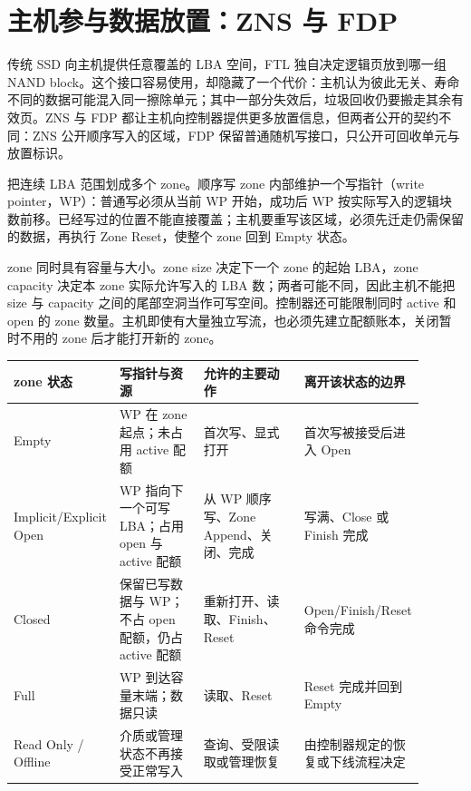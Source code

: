 \section{主机参与数据放置：ZNS 与 FDP}

传统 SSD 向主机提供任意覆盖的 LBA 空间，FTL 独自决定逻辑页放到哪一组 NAND block。这个接口容易使用，却隐藏了一个代价：主机认为彼此无关、寿命不同的数据可能混入同一擦除单元；其中一部分失效后，垃圾回收仍要搬走其余有效页。ZNS 与 FDP 都让主机向控制器提供更多放置信息，但两者公开的契约不同：ZNS 公开顺序写入的区域，FDP 保留普通随机写接口，只公开可回收单元与放置标识。\cite{nvme-zns-fdp}


把连续 LBA 范围划成多个 zone。顺序写 zone 内部维护一个写指针（write pointer，WP）：普通写必须从当前 WP 开始，成功后 WP 按实际写入的逻辑块数前移。已经写过的位置不能直接覆盖；主机要重写该区域，必须先迁走仍需保留的数据，再执行 Zone Reset，使整个 zone 回到 Empty 状态。

zone 同时具有容量与大小。zone size 决定下一个 zone 的起始 LBA，zone capacity 决定本 zone 实际允许写入的 LBA 数；两者可能不同，因此主机不能把 size 与 capacity 之间的尾部空洞当作可写空间。控制器还可能限制同时 active 和 open 的 zone 数量。主机即使有大量独立写流，也必须先建立配额账本，关闭暂时不用的 zone 后才能打开新的 zone。

\begin{longtable}{L{0.18\linewidth}L{0.24\linewidth}L{0.28\linewidth}L{0.20\linewidth}}
\toprule
zone 状态 & 写指针与资源 & 允许的主要动作 & 离开该状态的边界 \\
\midrule
Empty & WP 在 zone 起点；未占用 active 配额 & 首次写、显式打开 & 首次写被接受后进入 Open \\\tablerowrule
Implicit/\allowbreak Explicit Open & WP 指向下一个可写 LBA；占用 open 与 active 配额 & 从 WP 顺序写、Zone Append、关闭、完成 & 写满、Close 或 Finish 完成 \\\tablerowrule
Closed & 保留已写数据与 WP；不占 open 配额，仍占 active 配额 & 重新打开、读取、Finish、Reset & Open/\allowbreak Finish/\allowbreak Reset 命令完成 \\\tablerowrule
Full & WP 到达容量末端；数据只读 & 读取、Reset & Reset 完成并回到 Empty \\\tablerowrule
Read Only / Offline & 介质或管理状态不再接受正常写入 & 查询、受限读取或管理恢复 & 由控制器规定的恢复或下线流程决定 \\
\bottomrule
\end{longtable}

